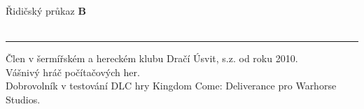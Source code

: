 \documentclass[a4paper,11pt]{article}
\begin{document}
\begin{paracol}{2}
\begin{rightcolumn}
        
        \vspace{19pt}
        \begin{parcolumns}{2}
        \end{parcolumns}

        \vspace{28pt}
        Řidičský průkaz \textbf{B} \\ \\
        \rule{\linewidth}{0.5pt}

        \vspace{18pt}
        Člen v šermířském a hereckém klubu Dračí Úsvit, s.z. od roku 2010. \\
        Vášnivý hráč počítačových her.\\
        Dobrovolník v testování DLC hry Kingdom Come: Deliverance pro Warhorse Studios.

    \end{rightcolumn}
\end{paracol}
\end{document}
